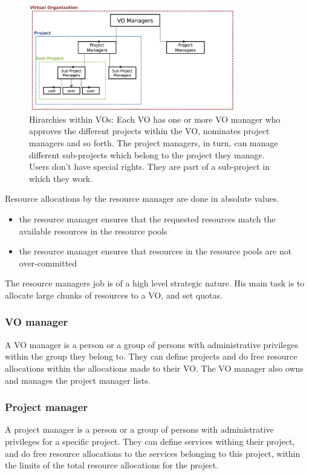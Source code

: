 \documentclass[12pt]{article}
\begin{document}
\begin{figure}
\begin{center}
\includegraphics[width=0.8\textwidth]{vo_roles.eps}
\caption{\label{vo_roles} Hirarchies within VOs: Each VO has one or more VO manager who approves the different projects within the VO, nominates project managers and so forth. The project managers, in turn, can manage different sub-projects which belong to the project they manage. Users don't have special rights. They are part of a sub-project in which they work. 
}
\end{center}
\end{figure}


Resource allocations by the resource manager are done in absolute values. 
\begin{itemize}
\item the resource manager ensures that the requested resources match the available resources in the resource pools
\item the resource manager ensures that resources in the resource pools are not over-committed
\end{itemize}
The resource managers job is of a high level strategic nature. His main task is to allocate large chunks of resources to a VO, and set quotas. 

\subsubsection{VO manager}
A VO manager is a person or a group of persons with administrative privileges within the group they belong to. They can define projects and do free resource allocations within the allocations made to their VO. The VO manager also owns and manages the project manager lists. 

\subsubsection{Project manager}
A project manager is a person or a group of persons with administrative privileges for a specific project. They can define services withing their project, and do free resource allocations to the services belonging to this project, within the limits of the total resource allocations for the project. 
\end{document}
